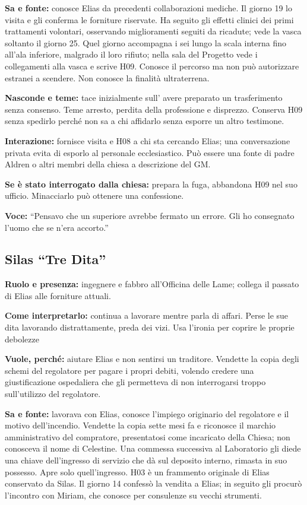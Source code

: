 \documentclass[11pt,a4paper]{article}
\begin{document}
\textbf{Sa e fonte:} conosce Elias da precedenti collaborazioni mediche. Il giorno 19 lo visita e gli conferma le forniture riservate. Ha seguito gli effetti clinici dei primi trattamenti volontari, osservando miglioramenti seguiti da ricadute; vede la vasca soltanto il giorno 25. Quel giorno accompagna i sei lungo la scala interna fino all'ala inferiore, malgrado il loro rifiuto; nella sala del Progetto vede i collegamenti alla vasca e scrive H09. Conosce il percorso ma non può autorizzare estranei a scendere. Non conosce la finalità ultraterrena.

\textbf{Nasconde e teme:} tace inizialmente sull' avere preparato un trasferimento senza consenso. Teme arresto, perdita della professione e disprezzo. Conserva H09 senza spedirlo perché non sa a chi affidarlo senza esporre un altro testimone.

\textbf{Interazione:} fornisce visita e H08 a chi sta cercando Elias; una conversazione privata evita di esporlo al personale ecclesiastico. Può essere una fonte di padre Aldren o altri membri della chiesa a descrizione del GM.

\textbf{Se è stato interrogato dalla chiesa:} prepara la fuga, abbandona H09 nel suo ufficio. Minacciarlo può ottenere una confessione.\par
\textbf{Voce:} ``Pensavo che un superiore avrebbe fermato un errore. Gli ho consegnato l'uomo che se n'era accorto.''

\subsection{Silas ``Tre Dita''}
\textbf{Ruolo e presenza:} ingegnere e fabbro all'Officina delle Lame; collega il passato di Elias alle forniture attuali.\par
\textbf{Come interpretarlo:} continua a lavorare mentre parla di affari. Perse le sue dita lavorando distrattamente, preda dei vizi. Usa l'ironia per coprire le proprie debolezze

\textbf{Vuole, perché:} aiutare Elias e non sentirsi un traditore. Vendette la copia degli schemi del regolatore per pagare i propri debiti, volendo credere una giustificazione ospedaliera che gli permetteva di non interrogarsi troppo sull'utilizzo del regolatore.

\textbf{Sa e fonte:} lavorava con Elias, conosce l'impiego originario del regolatore e il motivo dell'incendio. Vendette la copia sette mesi fa e riconosce il marchio amministrativo del compratore, presentatosi come incaricato della Chiesa; non conosceva il nome di Celestine. Una commessa successiva al Laboratorio gli diede una chiave dell'ingresso di servizio che dà sul deposito interno, rimasta in suo possesso. Apre solo quell'ingresso. H03 è un frammento originale di Elias conservato da Silas. Il giorno 14 confessò la vendita a Elias; in seguito gli procurò l'incontro con Miriam, che conosce per consulenze su vecchi strumenti.
\end{document}

